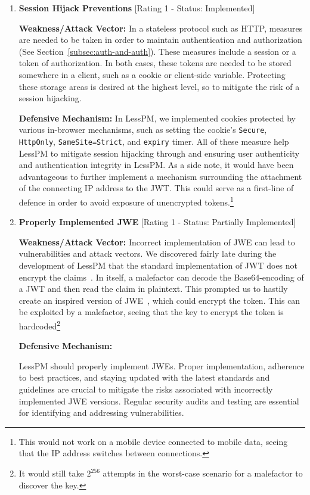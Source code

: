 \begin{enumerate}[label=$\blacktriangleright$]
  \item \textbf{Session Hijack Preventions} [Rating 1 - Status: Implemented]

  \textbf{Weakness/Attack Vector:}
  In a stateless protocol such as HTTP, measures are needed to be taken in
  order to maintain authentication and authorization (See
  Section~\ref{subsec:auth-and-auth}).
  These measures include a session or a token of authorization.
  In both cases, these tokens are needed to be stored somewhere in a client,
  such as a cookie or client-side variable.
  Protecting these storage areas is desired at the highest level, so to
  mitigate the risk of a session hijacking.

  \textbf{Defensive Mechanism:}
  In LessPM, we implemented cookies protected by various in-browser
  mechanisms, such as setting the cookie's \texttt{Secure}, \texttt{HttpOnly},
  \texttt{SameSite=Strict}, and \texttt{expiry} timer.
  All of these measure help LessPM to mitigate session hijacking through and
  ensuring user authenticity and authentication integrity in LessPM\@.
  As a side note, it would have been advantageous to further implement a
  mechanism surrounding the attachment of the connecting IP address to the
  JWT\@.
  This could serve as a first-line of defence in order to avoid exposure of
  unencrypted tokens.\footnote{
    This would not work on a mobile device connected to mobile data,
    seeing that the IP address switches between connections.
  }

  \item \textbf{Properly Implemented JWE} [Rating 1 - Status: Partially
  Implemented]

  \textbf{Weakness/Attack Vector:}
  Incorrect implementation of JWE can lead to vulnerabilities and attack
  vectors.
  We discovered fairly late during the development of LessPM that the
  standard implementation of JWT does not encrypt the claims~\cite{RFC7519}.
  In itself, a malefactor can decode the Base64-encoding of a JWT and then
  read the claim in plaintext.
  This prompted us to hastily create an inspired version of JWE~\cite{rfc7516
  }, which could encrypt the token.
  This can be exploited by a malefactor, seeing that the key to encrypt the
  token is hardcoded\footnote{
    It would still take $2^{256}$ attempts in the worst-case scenario for a
    malefactor to discover the key.
  }

  \textbf{Defensive Mechanism:}

  LessPM should properly implement JWEs.
  Proper implementation, adherence to best practices, and staying updated with
  the latest standards and guidelines are crucial to mitigate the risks
  associated with incorrectly implemented JWE versions.
  Regular security audits and testing are essential for identifying and
  addressing vulnerabilities.
  

\end{enumerate}
